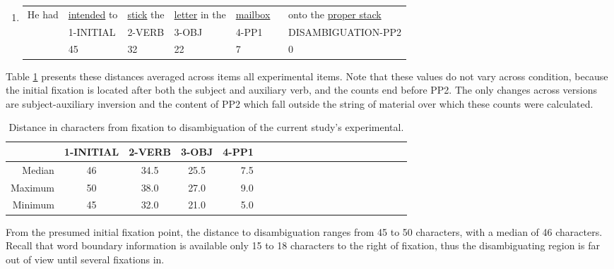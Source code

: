 \documentclass[11pt,oneside]{book}
\begin{document}
\begin{enumerate}
\def\labelenumi{(\arabic{enumi})}
\setcounter{enumi}{36}
\item
  \begingroup
    \setlength{\tabcolsep}{1pt}
    \begin{tabular}{lllll|l}
  He had & 
  \underline{intended} to & 
  \underline{stick} the & 
  \underline{letter} in the & 
  \underline{mailbox} \  & onto the \underline{proper stack} \\
  & \footnotesize 1-INITIAL & \footnotesize 2-VERB & \footnotesize 3-OBJ & \footnotesize 4-PP1 & \footnotesize DISAMBIGUATION-PP2 \\
  & 45 & 32 & 22 & 7 & 0
  \end{tabular}
  \endgroup
\end{enumerate}

Table \ref{tab:dtcs} presents these distances averaged across items all experimental items. Note that these values do not vary across condition, because the initial fixation is located after both the subject and auxiliary verb, and the counts end before PP2. The only changes across versions are subject-auxiliary inversion and the content of PP2 which fall outside the string of material over which these counts were calculated.

\begin{table}[!h]

\caption{\label{tab:dtcs}Distance in characters from fixation to disambiguation of the current study's experimental.}
\centering
\begin{tabular}{rcccrcccrcccrcccrccc}
\toprule
  & 1-INITIAL & 2-VERB & 3-OBJ & 4-PP1\\
\midrule
Median & 46 & 34.5 & 25.5 & 7.5\\
Maximum & 50 & 38.0 & 27.0 & 9.0\\
Minimum & 45 & 32.0 & 21.0 & 5.0\\
\bottomrule
\end{tabular}
\end{table}

From the presumed initial fixation point, the distance to disambiguation ranges from 45 to 50 characters, with a median of 46 characters. Recall that word boundary information is available only 15 to 18 characters to the right of fixation, thus the disambiguating region is far out of view until several fixations in.
\end{document}
